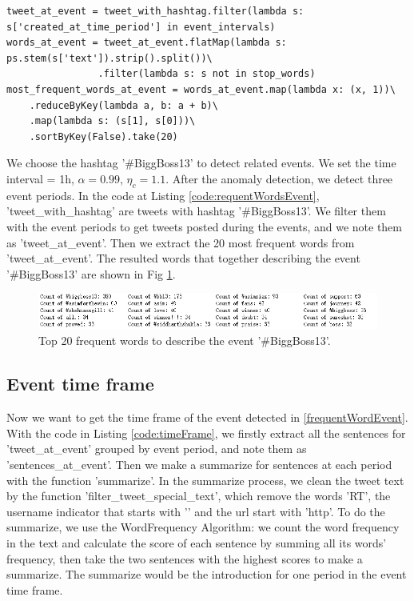 \begin{lstlisting}[caption=Frequent Words describing an event, label={code:requentWordsEvent}]
tweet_at_event = tweet_with_hashtag.filter(lambda s: s['created_at_time_period'] in event_intervals)
words_at_event = tweet_at_event.flatMap(lambda s: ps.stem(s['text']).strip().split())\
                .filter(lambda s: s not in stop_words)
most_frequent_words_at_event = words_at_event.map(lambda x: (x, 1))\
    .reduceByKey(lambda a, b: a + b)\
    .map(lambda s: (s[1], s[0]))\
    .sortByKey(False).take(20)

\end{lstlisting}

We choose the hashtag '\#BiggBoss13' to detect related events. We set the time interval = 1h, $\alpha = 0.99$, $\eta_c = 1.1$. After the anomaly detection, we detect three event periods. In the code at Listing \ref{code:requentWordsEvent}, 'tweet\_with\_hashtag' are  tweets with hashtag '\#BiggBoss13'. We filter them with the event periods to get tweets posted during the events, and we note them as 'tweet\_at\_event'. Then we extract the 20 most frequent words from 'tweet\_at\_event'. The resulted words that together describing the event '\#BiggBoss13' are shown in Fig \ref{fig:top20_words_bigboss}.

\begin{figure}[H]
    \centering
    \includegraphics[width=1\textwidth]{images/top20_words_bigboss.png}
    \caption{Top 20 frequent words to describe the event '\#BiggBoss13'.}
    \label{fig:top20_words_bigboss}
\end{figure}


\subsection{Event time frame}

Now we want to get the time frame of the event detected in \ref{frequentWordEvent}. With the code in Listing \ref{code:timeFrame}, we firstly extract all the sentences for 'tweet\_at\_event' grouped by event period, and note them as 'sentences\_at\_event'. Then we make a summarize for sentences at each period with the function 'summarize'. In the summarize process, we clean the tweet text by the function 'filter\_tweet\_special\_text', which remove the words 'RT', the username indicator that starts with '\@' and the url start with 'http'. To do the summarize, we use the WordFrequency Algorithm: we count the word frequency in the text and calculate the score of each sentence by summing all its words' frequency, then take the two sentences with the highest scores to make a summarize. The summarize would be the introduction for one period in the event time frame. 

